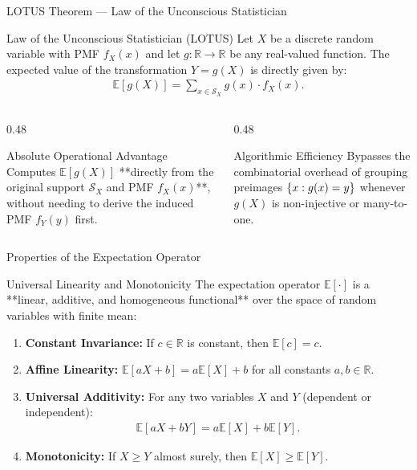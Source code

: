 \documentclass[aspectratio=169,xcolor={dvipsnames,table}]{beamer}
\begin{document}
\begin{frame}{LOTUS Theorem --- Law of the Unconscious Statistician}
	\begin{block}{Law of the Unconscious Statistician (LOTUS)}
		\small
		Let $X$ be a discrete random variable with PMF $f_X(x)$ and let $g: \mathbb{R} \to \mathbb{R}$ be any real-valued function. The expected value of the transformation $Y = g(X)$ is directly given by:
		\begin{align*}
			\mathbb{E}[g(X)] = \sum_{x \in \mathcal{S}_X} g(x) \cdot f_X(x).
		\end{align*}
	\end{block}
	\vspace{-0.15cm}
	\begin{columns}[T]
		\begin{column}{0.48\textwidth}
			\begin{exampleblock}{Absolute Operational Advantage}
				\footnotesize
				Computes $\mathbb{E}[g(X)]$ **directly from the original support $\mathcal{S}_X$ and PMF $f_X(x)$**, without needing to derive the induced PMF $f_Y(y)$ first.
			\end{exampleblock}
		\end{column}
		\begin{column}{0.48\textwidth}
			\begin{alertblock}{Algorithmic Efficiency}
				\footnotesize
				Bypasses the combinatorial overhead of grouping preimages $\left\{ x : g(x) = y \right\}$ whenever $g(X)$ is non-injective or many-to-one.
			\end{alertblock}
		\end{column}
	\end{columns}
\end{frame}

\begin{frame}{Properties of the Expectation Operator}
	\begin{block}{Universal Linearity and Monotonicity}
		\small
		The expectation operator $\mathbb{E}[\cdot]$ is a **linear, additive, and homogeneous functional** over the space of random variables with finite mean:
		\begin{enumerate}
			\itemsep=0.06cm
			\item \textbf{Constant Invariance:} If $c \in \mathbb{R}$ is constant, then $\mathbb{E}[c] = c$.
			\item \textbf{Affine Linearity:} $\mathbb{E}[aX + b] = a\mathbb{E}[X] + b$ for all constants $a, b \in \mathbb{R}$.
			\item \textbf{Universal Additivity:} For any two variables $X$ and $Y$ (dependent or independent):
			\begin{align*}
				\mathbb{E}[aX + bY] = a\mathbb{E}[X] + b\mathbb{E}[Y].
			\end{align*}
			\item \textbf{Monotonicity:} If $X \ge Y$ almost surely, then $\mathbb{E}[X] \ge \mathbb{E}[Y]$.
		\end{enumerate}
	\end{block}
\end{frame}
\end{document}
